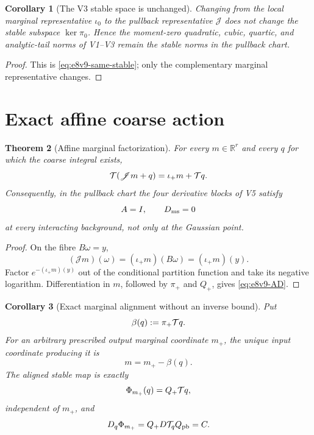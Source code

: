 \documentclass[11pt,oneside]{book}
\newtheorem{theorem}{Theorem}[chapter]
\newtheorem{corollary}[theorem]{Corollary}
\theoremstyle{definition}
\theoremstyle{remark}
\begin{document}
\begin{corollary}[The V3 stable space is unchanged]
\label{cor:e8v9-stable-unchanged}
Changing from the local marginal representative \(\iota_0\) to the
pullback representative \({\mathscr J}\) does not change the stable
subspace \(\ker\pi_0\).  Hence the moment-zero quadratic, cubic,
quartic, and analytic-tail norms of V1--V3 remain the stable norms in
the pullback chart.
\end{corollary}

\begin{proof}
This is \eqref{eq:e8v9-same-stable}; only the complementary marginal
representative changes.
\end{proof}

\section{Exact affine coarse action}
\label{sec:e8v9-affine}

\begin{theorem}[Affine marginal factorization]
\label{thm:e8v9-affine}
For every \(m\in\mathbb R^r\) and every \(q\) for which the coarse
integral exists,
\[
 {\cal T}({\mathscr J}m+q)
 =\iota_+m+{\cal T}q.                               \label{eq:e8v9-affine}
\]
Consequently, in the pullback chart the four derivative blocks of V5
satisfy
\[
 A=I,\qquad D_{\rm ms}=0                            \label{eq:e8v9-AD}
\]
at every interacting background, not only at the Gaussian point.
\end{theorem}

\begin{proof}
On the fibre \(B\omega=y\),
\[
 ({\mathscr J}m)(\omega)
 =(\iota_+m)(B\omega)=(\iota_+m)(y).
\]
Factor \(e^{-(\iota_+m)(y)}\) out of the conditional partition
function and take its negative logarithm.  Differentiation in \(m\),
followed by \(\pi_+\) and \(Q_+\), gives
\eqref{eq:e8v9-AD}.
\end{proof}

\begin{corollary}[Exact marginal alignment without an inverse bound]
\label{cor:e8v9-alignment}
Put
\[
 \beta(q):=\pi_+{\cal T}q.                          \label{eq:e8v9-beta}
\]
For an arbitrary prescribed output marginal coordinate \(m_+\), the
unique input coordinate producing it is
\[
 m=m_+-\beta(q).                                    \label{eq:e8v9-m-calibration}
\]
The aligned stable map is exactly
\[
 \Phi_{m_+}(q)
 =Q_+{\cal T}q,                                     \label{eq:e8v9-stable-map}
\]
independent of \(m_+\), and
\[
 D_q\Phi_{m_+}=Q_+D{\cal T}_qQ_{\rm pb}=C.           \label{eq:e8v9-stable-derivative}
\]
\end{corollary}
\end{document}
